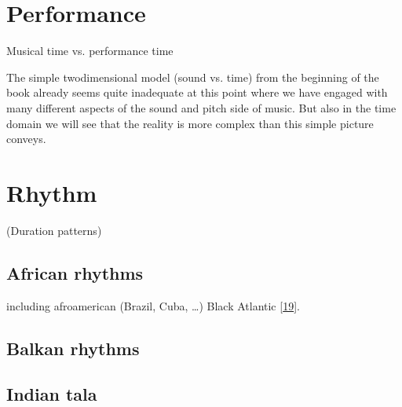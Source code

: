 \documentclass[letterpaper,10pt,english]{sphinxmanual}
\begin{document}
\section{Performance}
\label{\detokenize{4_time:performance}}
\sphinxAtStartPar
Musical time vs. performance time

\sphinxAtStartPar
The simple two\sphinxhyphen{}dimensional model (sound vs. time) from the beginning of the book already
seems quite inadequate at this point where we have engaged with many different aspects of the
sound and pitch side of music. But also in the time domain we will see that the reality is more
complex than this simple picture conveys.


\section{Rhythm}
\label{\detokenize{4_time:rhythm}}
\sphinxAtStartPar
(Duration patterns)


\subsection{African rhythms}
\label{\detokenize{4_time:african-rhythms}}
\sphinxAtStartPar
including afro\sphinxhyphen{}american (Brazil, Cuba, …) Black Atlantic {[}\hyperlink{cite.8_bibliography:id6}{19}{]}.


\subsection{Balkan rhythms}
\label{\detokenize{4_time:balkan-rhythms}}

\subsection{Indian tala}
\label{\detokenize{4_time:indian-tala}}
\end{document}
